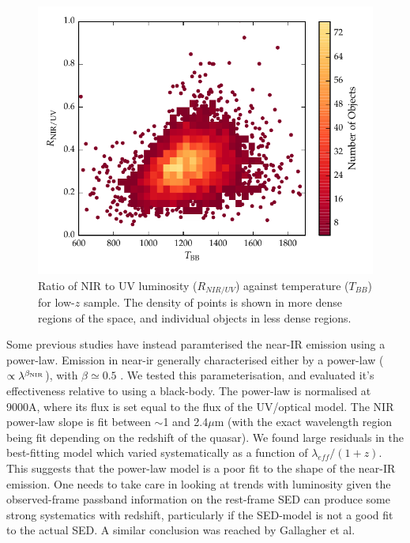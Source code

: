 \begin{figure}
  \centering
  \includegraphics[width=\textwidth]{figures/chapter05/ratio_tbb_density.pdf}
  \caption{Ratio of NIR to UV luminosity ($R_{NIR/UV}$) against temperature ($T_{BB}$) for low-$z$ sample. The density of points is shown in more dense regions of the space, and individual objects in less dense regions. }
  \label{fig:ratio_tbb_density}
\end{figure}

Some previous studies \citep[e.g.][]{wang13,zhang14} have instead paramterised the near-IR emission using a power-law.
Emission in near-ir generally characterised either by a power-law ($\propto \lambda^{\beta_{\rm NIR}}$), with $\beta \simeq 0.5$ \citep[e.g.][]{richards06, zhang14}. 
We tested this parameterisation, and evaluated it's effectiveness relative to using a black-body. 
The power-law is normalised at 9000A, where its flux is set equal to the flux of the UV/optical model. 
The NIR power-law slope is fit between $\sim$1 and 2.4$\mu$m (with the exact wavelength region being fit depending on the redshift of the quasar). 
We found large residuals in the best-fitting model which varied systematically as a function of $\lambda_{eff}/(1+z)$.  
This suggests that the power-law model is a poor fit to the shape of the near-IR emission. 
One needs to take care in looking at trends with luminosity given the observed-frame passband information on the rest-frame SED can produce some strong systematics with redshift, particularly if the SED-model is not a good fit to the actual SED. 
A similar conclusion was reached by Gallagher et al.

